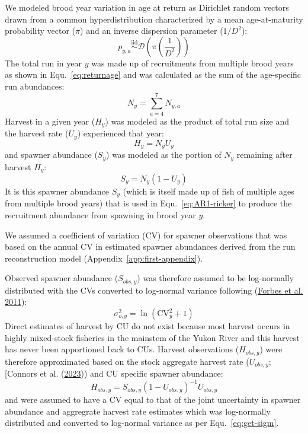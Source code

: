 \documentclass[11pt]{book}
\begin{document}
We modeled brood year variation in age at return as Dirichlet random vectors drawn from a common hyperdistribution characterized by a mean age-at-maturity probability vector (\(\pi\)) and an inverse dispersion parameter (\(1/D^2\)):
\begin{equation}
  p_{y,a}  \stackrel{\mathrm{iid}}{\sim}  \mathcal{D}(\pi(\frac{1}{D^2}))
  \label{eq:returnagevar}
\end{equation}
The total run in year \(y\) was made up of recruitments from multiple brood years as shown in Equ.~\ref{eq:returnage} and was calculated as the sum of the age-specific run abundances:
\begin{equation}
  N_{y} = \sum_{a=4}^{7} N_{y,a}
  \label{eq:totalreturn}
\end{equation}
Harvest in a given year (\(H_y\)) was modeled as the product of total run size and the harvest rate (\(U_y\)) experienced that year:
\begin{equation}
  H_y = N_y U_y
  \label{eq:harvest}
\end{equation}
and spawner abundance (\(S_y\)) was modeled as the portion of \(N_y\) remaining after harvest \(H_y\):
\begin{equation}
  S_y = N_y (1 - U_y)
  \label{eq:spawners}
\end{equation}
It is this spawner abundance \(S_y\) (which is itself made up of fish of multiple ages from multiple brood years) that is used in Equ.~\ref{eq:AR1-ricker} to produce the recruitment abundance from spawning in brood year \(y\).

\hypertarget{observation-model}{%
\label{observation-model}}

We assumed a coefficient of variation (CV) for spawner observations that was based on the annual CV in estimated spawner abundances derived from the run reconstruction model (Appendix~\ref{app:first-appendix}).

Observed spawner abundance (\(S_{obs,y}\)) was therefore assumed to be log-normally distributed with the CVs converted to log-normal variance following (\protect\hyperlink{ref-forbes-etal-2011}{Forbes et al. 2011}):
\begin{equation}
  \sigma^2_{o,y} = \ln\left(\mathrm{CV}_y^2 + 1\right)
  \label{eq:get-sigm}
\end{equation}
Direct estimates of harvest by CU do not exist because most harvest occurs in highly mixed-stock fisheries in the mainstem of the Yukon River and this harvest has never been apportioned back to CUs. Harvest observations (\(H_{obs,y}\)) were therefore approximated based on the stock aggregate harvest rate (\(U_{obs,y}\); {[}Connors et al. (\protect\hyperlink{ref-connors_estimates_2023}{2023})) and CU specific spawner abundance:
\begin{equation}
  H_{obs,y} = S_{obs,y}(1-U_{obs,y})^{-1}U_{obs,y}
  \label{eq:obs-harvest}
\end{equation}
and were assumed to have a CV equal to that of the joint uncertainty in spawner abundance and aggregrate harvest rate estimates which was log-normally distributed and converted to log-normal variance as per Equ.~\ref{eq:get-sigm}.
\end{document}
